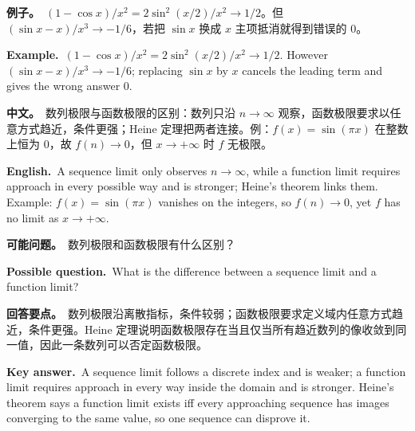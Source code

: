 \documentclass[UTF8,11pt,a4paper]{ctexart}
\newcommand{\BOTH}[2]{\par\noindent\textbf{中文。}\ #1\par\noindent\textbf{English.}\ #2\par}
\newcommand{\EX}[2]{\par\noindent\textbf{例子。}\ #1\par\noindent\textbf{Example.}\ #2\par}
\newcommand{\ASK}[4]{\begin{samepage}\par\noindent\textbf{可能问题。}\ #1\par\noindent\textbf{Possible question.}\ #2\par\noindent\textbf{回答要点。}\ #3\par\noindent\textbf{Key answer.}\ #4\medskip\end{samepage}}
\begin{document}
\EX{$(1-\cos x)/x^2=2\sin^2(x/2)/x^2\to1/2$。但 $(\sin x-x)/x^3\to-1/6$，若把 $\sin x$ 换成 $x$ 主项抵消就得到错误的 $0$。}{$(1-\cos x)/x^2=2\sin^2(x/2)/x^2\to1/2$. However $(\sin x-x)/x^3\to-1/6$; replacing $\sin x$ by $x$ cancels the leading term and gives the wrong answer $0$.}
\BOTH{数列极限与函数极限的区别：数列只沿 $n\to\infty$ 观察，函数极限要求以任意方式趋近，条件更强；Heine 定理把两者连接。例：$f(x)=\sin(\pi x)$ 在整数上恒为 $0$，故 $f(n)\to0$，但 $x\to+\infty$ 时 $f$ 无极限。}{A sequence limit only observes $n\to\infty$, while a function limit requires approach in every possible way and is stronger; Heine's theorem links them. Example: $f(x)=\sin(\pi x)$ vanishes on the integers, so $f(n)\to0$, yet $f$ has no limit as $x\to+\infty$.}
\ASK{数列极限和函数极限有什么区别？}{What is the difference between a sequence limit and a function limit?}{数列极限沿离散指标，条件较弱；函数极限要求定义域内任意方式趋近，条件更强。Heine 定理说明函数极限存在当且仅当所有趋近数列的像收敛到同一值，因此一条数列可以否定函数极限。}{A sequence limit follows a discrete index and is weaker; a function limit requires approach in every way inside the domain and is stronger. Heine's theorem says a function limit exists iff every approaching sequence has images converging to the same value, so one sequence can disprove it.}
\end{document}
